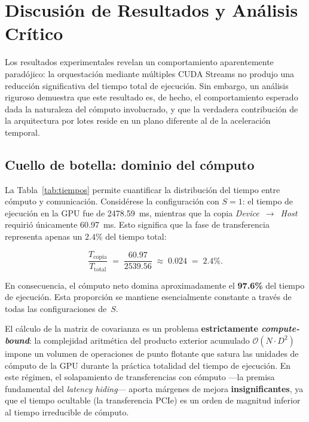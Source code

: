\documentclass[12pt, a4paper]{article}
\begin{document}
\section{Discusión de Resultados y Análisis Crítico}

Los resultados experimentales revelan un comportamiento aparentemente
paradójico: la orquestación mediante múltiples CUDA Streams no produjo una
reducción significativa del tiempo total de ejecución. Sin embargo, un análisis
riguroso demuestra que este resultado es, de hecho, el comportamiento esperado
dada la naturaleza del cómputo involucrado, y que la verdadera contribución de
la arquitectura por lotes reside en un plano diferente al de la aceleración
temporal.

\subsection{Cuello de botella: dominio del cómputo}

La Tabla~\ref{tab:tiempos} permite cuantificar la distribución del tiempo
entre cómputo y comunicación. Considérese la configuración con $S = 1$: el
tiempo de ejecución en la GPU fue de 2478.59~ms, mientras que la copia
\textit{Device}~$\to$~\textit{Host} requirió únicamente 60.97~ms. Esto
significa que la fase de transferencia representa apenas un
$\mathbf{2.4\%}$ del tiempo total:

\begin{equation}
    \frac{T_{\text{copia}}}{T_{\text{total}}} \;=\;
    \frac{60.97}{2539.56} \;\approx\; 0.024 \;=\; 2.4\%.
\end{equation}

En consecuencia, el cómputo neto domina aproximadamente el \textbf{97.6\%}
del tiempo de ejecución. Esta proporción se mantiene esencialmente constante
a través de todas las configuraciones de~$S$.

El cálculo de la matriz de covarianza es un problema \textbf{estrictamente
\textit{compute-bound}}: la complejidad aritmética del producto exterior
acumulado $\mathcal{O}(N \cdot D^2)$ impone un volumen de operaciones de punto
flotante que satura las unidades de cómputo de la GPU durante la práctica
totalidad del tiempo de ejecución. En este régimen, el solapamiento de
transferencias con cómputo ---la premisa fundamental del \textit{latency
hiding}--- aporta márgenes de mejora \textbf{insignificantes}, ya que el
tiempo ocultable (la transferencia PCIe) es un orden de magnitud inferior al
tiempo irreducible de cómputo.
\end{document}
